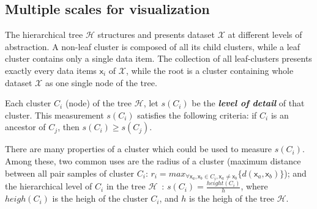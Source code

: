 
\vspace{-2.75mm}
\subsection{Multiple scales for visualization}
\label{subsec:multiple_scales}
\vspace{-2mm}
The hierarchical tree $\mathcal{H}$ structures and presents dataset $\mathcal{X}$ at different levels of abstraction. A non-leaf cluster is composed of all its child clusters, while a leaf cluster contains only a single data item. The collection of all leaf-clusters presents exactly every data items $\mathsf{x}_i$ of $\mathcal{X}$, while the root is a cluster containing whole dataset $\mathcal{X}$ as one single node of the tree.
\begin{definition}
\label{def:level_detail}
Each cluster $C_i$ (node) of the tree $\mathcal{H}$, let $s(C_i)$ be the \textbf{\textit{level of detail}} of that cluster. This measurement $s(C_i)$ satisfies the following criteria: if $C_i$ is an ancestor of $C_j$, then $s(C_i) \geq s(C_j)$. 
\end{definition}
There are many properties of a cluster which could be used to measure $s(C_i)$. Among these, two common uses are the radius of a cluster (maximum distance between all pair samples of cluster $C_i$: $r_i = max_{\forall \mathsf{x}_a, \mathsf{x}_b
 \in C_i, \mathsf{x}_a \neq \mathsf{x}_b} \{d(\mathsf{x}_a,\mathsf{x}_b)\}$); and the hierarchical level of $C_i$ in the tree $\mathcal{H}$~\cite{yang2003interactive}: $s(C_i) = \frac{height(C_i)}{h}$, where $heigh(C_i)$ is the heigh of the cluster $C_i$, and $h$ is the heigh of the tree $\mathcal{H}$.

